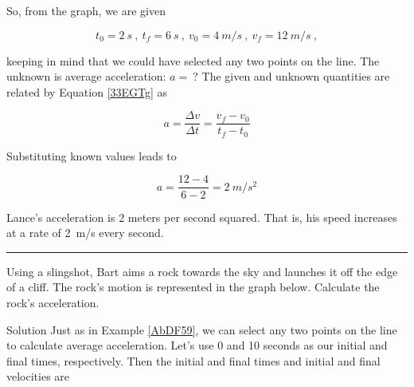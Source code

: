 \documentclass[dvipsnames]{article}
\begin{document}
So, from the graph, we are given

\begin{equation*}
    t_0 = \SI{2}{s}\ ,\ t_f = \SI{6}{s}\ ,\ 
    v_0 = \SI{4}{m/s}\ ,\ v_f = \SI{12}{m/s}\ ,
\end{equation*}

keeping in mind that we could have selected any two points on the line. The unknown is average acceleration: $a =\ ?$ The given and unknown quantities are related by Equation \eqref{33EGTg} as

\begin{equation*}
    a = \frac{\Delta{v}}{\Delta{t}} = \frac{v_f - v_0}{t_f - t_0}
\end{equation*}

Substituting known values leads to

\begin{equation*}
    a = \frac{12 - 4}{6 - 2} = \SI{2}{m/s^2}
\end{equation*}

Lance's acceleration is 2 meters per second squared. That is, his speed increases at a rate of \SI{2}{m/s} every second.

\hrule

\begin{example}
    Using a slingshot, Bart aims a rock towards the sky and launches it off the edge of a cliff. The rock's motion is represented in the graph below. Calculate the rock's acceleration.
\end{example}

\begin{center}
\end{center}

Solution Just as in Example \ref{AbDF59}, we can select any two points on the line to calculate average acceleration. Let's use 0 and 10 seconds as our initial and final times, respectively. Then the initial and final times and initial and final velocities are
\end{document}

